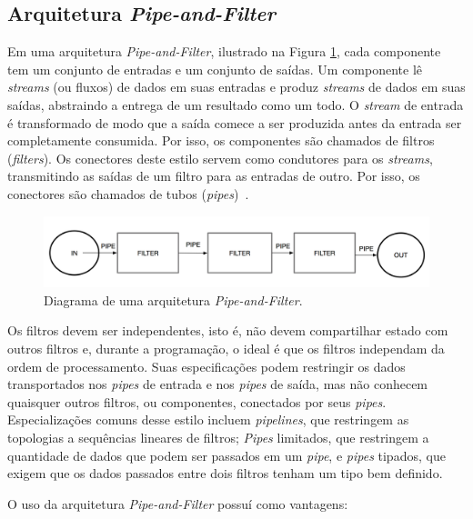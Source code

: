 \documentclass[portugues]{ic-tese}
\begin{document}
\subsection{Arquitetura \textit{Pipe-and-Filter}}

Em uma arquitetura \textit{Pipe-and-Filter}, ilustrado na Figura \ref{fig:PipeandFilter}, cada componente tem um conjunto de entradas e um conjunto de saídas. Um componente lê \textit{streams} (ou fluxos) de dados em suas entradas e produz \textit{streams} de dados em suas saídas, abstraindo a entrega de um resultado como um todo. O \textit{stream} de entrada é transformado de modo que a saída comece a ser produzida antes da entrada ser completamente consumida. Por isso, os componentes são chamados de filtros (\textit{filters}). Os conectores deste estilo servem como condutores para os \textit{streams}, transmitindo as saídas de um filtro para as entradas de outro. Por isso, os conectores são chamados de tubos (\textit{pipes})~\citep{Garlan_1993}.

\begin{figure}[h]
\centering
\includegraphics[scale=0.25]{images/PipeandFilter.png}
\caption {Diagrama de uma arquitetura \textit{Pipe-and-Filter}.}
\label{fig:PipeandFilter}
\end{figure}

Os filtros devem ser independentes, isto é, não devem compartilhar estado com outros filtros e, durante a programação, o ideal é que os filtros independam da ordem de processamento. Suas especificações podem restringir os dados transportados nos \textit{pipes} de entrada e nos \textit{pipes} de saída, mas não conhecem quaisquer outros filtros, ou componentes, conectados por seus \textit{pipes}. Especializações comuns desse estilo incluem \textit{pipelines}, que restringem as topologias a sequências lineares de filtros; \textit{Pipes} limitados, que restringem a quantidade de dados que podem ser passados em um \textit{pipe}, e \textit{pipes} tipados, que exigem que os dados passados entre dois filtros tenham um tipo bem definido.

O uso da arquitetura \textit{Pipe-and-Filter} possuí como vantagens:
\end{document}
